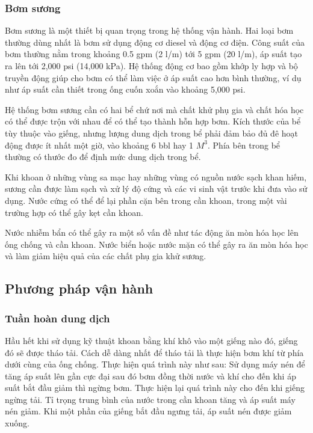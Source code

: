 \documentclass[13pt,a4paper]{article}
\begin{document}
\subsubsection{Bơm sương}
	Bơm sương là một thiết bị quan trọng trong hệ thống vận hành. Hai loại bơm thường dùng nhất là bơm sử dụng động cơ diesel và động cơ điện. Công suất của bơm thường nằm trong khoảng 0.5 gpm (2 l/m) tới 5 gpm (20 l/m), áp suất tạo ra lên tới 2,000 psi (14,000 kPa). Hệ thống động cơ bao gồm khớp ly hợp và bộ truyền động giúp cho bơm có thể làm việc ở áp suất cao hơn bình thường, ví dụ như áp suất cần thiết trong ống cuốn xoắn vào khoảng 5,000 psi.\par
	Hệ thống bơm sương cần có hai bể chứ nơi mà chất khử phụ gia và chất hóa học có thể được trộn với nhau để có thể tạo thành hỗn hợp bơm. Kích thước của bể tùy thuộc vào giếng, nhưng lượng dung dịch trong bể phải đảm bảo đủ đê hoạt động được ít nhất một giờ, vào khoảng 6 bbl hay 1 $M^3$. Phía bên trong bể thường có thước đo để định mức dung dịch trong bể.\par
	Khi khoan ở những vùng sa mạc hay những vùng có nguồn nước sạch khan hiếm, sương cần được làm sạch và xử lý độ cứng và các vi sinh vật trước khi đưa vào sử dụng. Nước cứng có thể để lại phần cặn bên trong cần khoan, trong một vài trường hợp có thể gây kẹt cần khoan.\par
	Nước nhiễm bẩn có thể gây ra một số vấn đề như tác động ăn mòn hóa học lên ống chống và cần khoan. Nước biển hoặc nước mặn có thể gây ra ăn mòn hóa học và làm giảm hiệu quả của các chất phụ gia khử sương.
\subsection{Phương pháp vận hành}
\subsubsection{Tuần hoàn dung dịch}
	Hầu hết khi sử dụng kỹ thuật khoan bằng khí khô vào một giếng nào đó, giếng đó sẽ được tháo tải. Cách dễ dàng nhất để tháo tải là thực hiện bơm khí từ phía dưới cùng của ống chống. Thực hiện quá trình này như sau: Sử dụng máy nén để tăng áp suất lên gần cực đại sau đó bơm đồng thời nước và khí cho đến khi áp suất bắt đầu giảm thì ngừng bơm. Thực hiện lại quá trình này cho đến khi giếng ngừng tải. Tỉ trọng trung bình của nước trong cần khoan tăng và áp suất máy nén giảm. Khi một phần của giếng bắt đầu ngưng tải, áp suất nén được giảm xuống.
\end{document}
